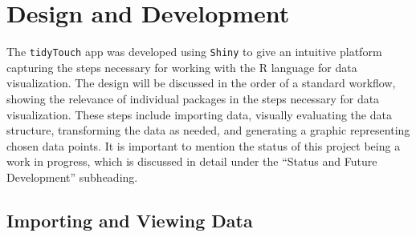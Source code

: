 \documentclass[english,man,floatsintext]{apa6}
\begin{document}
\hypertarget{design-and-development}{%
\section{Design and Development}\label{design-and-development}}

The \texttt{tidyTouch} app was developed using \texttt{Shiny} to give an intuitive platform capturing the steps necessary for working with the R language for data visualization. The design will be discussed in the order of a standard workflow, showing the relevance of individual packages in the steps necessary for data visualization. These steps include importing data, visually evaluating the data structure, transforming the data as needed, and generating a graphic representing chosen data points. It is important to mention the status of this project being a work in progress, which is discussed in detail under the \enquote{Status and Future Development} subheading.

\hypertarget{importing-and-viewing-data}{%
\subsection{Importing and Viewing Data}\label{importing-and-viewing-data}}
\end{document}
